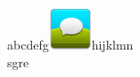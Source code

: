 \documentclass{article}
\begin{document}
abcdefg\includegraphics[scale=0.5]{./test.png}hijklmn \\
sgre
\end{document}
